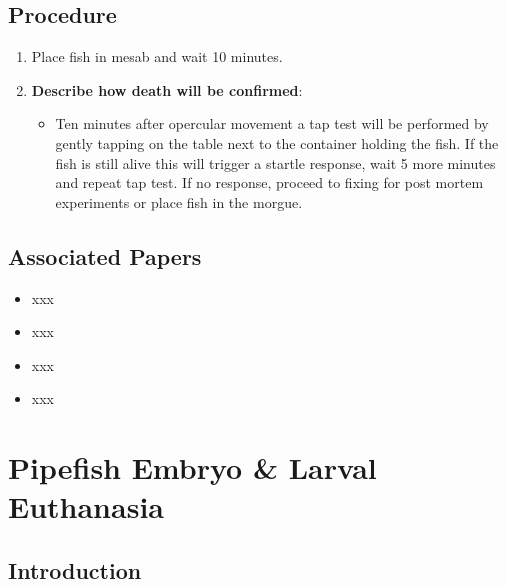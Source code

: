 \documentclass[
  letterpaper,
  DIV=11,
  numbers=noendperiod]{scrreprt}
\providecommand{\tightlist}{%
  \setlength{\itemsep}{0pt}\setlength{\parskip}{0pt}}\usepackage{longtable,booktabs,array}
\begin{document}
\hypertarget{procedure-18}{%
\section{Procedure}\label{procedure-18}}

\begin{enumerate}
\def\labelenumi{\arabic{enumi}.}
\tightlist
\item
  Place fish in mesab and wait 10 minutes.
\item
  \textbf{Describe how death will be confirmed}:

  \begin{itemize}
  \tightlist
  \item
    Ten minutes after opercular movement a tap test will be performed by
    gently tapping on the table next to the container holding the fish.
    If the fish is still alive this will trigger a startle response,
    wait 5 more minutes and repeat tap test. If no response, proceed to
    fixing for post mortem experiments or place fish in the morgue.
  \end{itemize}
\end{enumerate}

\hypertarget{associated-papers-11}{%
\section{Associated Papers}\label{associated-papers-11}}

\begin{itemize}
\tightlist
\item
  xxx
\item
  xxx
\item
  xxx
\item
  xxx
\end{itemize}

\hypertarget{sec-husb-pipe_larval_euth}{%
\chapter{Pipefish Embryo \& Larval
Euthanasia}\label{sec-husb-pipe_larval_euth}}

\hypertarget{introduction-19}{%
\section{Introduction}\label{introduction-19}}
\end{document}
